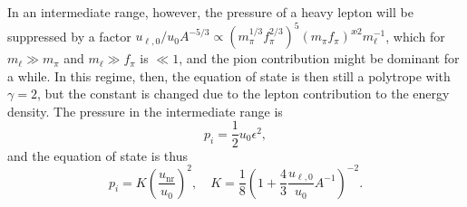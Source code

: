 In an intermediate range, however, the pressure of a heavy lepton will be suppressed by a factor $u_{\ell,0}/ u_0 A^{-5/3}\propto (m_\pi^{1/3} f_\pi^{{2}/{3}})^5 (m_\pi f_\pi)^{æ2} m_\ell^{-1}$, which for $m_\ell \gg m_\pi$ and $m_\ell \gg f_\pi$ is $\ll 1$, and the pion contribution might be dominant for a while.
In this regime, then, the equation of state is then still a polytrope with $\gamma = 2$, but the constant is changed due to the lepton contribution to the energy density.
The pressure in the intermediate range is
%
\begin{equation}
    p_i = \frac{1}{2} u_0 \epsilon^2,
\end{equation}
%
and the equation of state is thus
%
\begin{equation}
    p_i = K \left(\frac{u_\text{nr}}{u_0}\right)^2, \quad 
    K = \frac{1}{8} \left( 1 + \frac{4}{3} \frac{u_{\ell,0}}{u_0} A^{-1} \right)^{-2}.
\end{equation}


